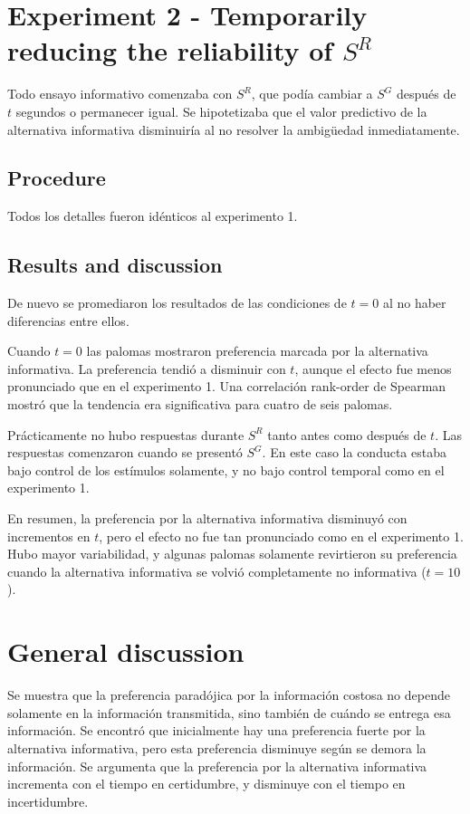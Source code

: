\documentclass[a4paper,12pt]{article}
\begin{document}
\section{Experiment 2 - Temporarily reducing the reliability of $S^{R}$}

Todo ensayo informativo comenzaba con $S^{R}$, que podía cambiar a $S^{G}$ después de $t$ segundos o permanecer igual.
Se hipotetizaba que el valor predictivo de la alternativa informativa disminuiría al no resolver la ambigüedad inmediatamente.

\subsection{Procedure}

Todos los detalles fueron idénticos al experimento 1.

\subsection{Results and discussion}

De nuevo se promediaron los resultados de las condiciones de $t = 0$ al no haber diferencias entre ellos.

Cuando $t = 0$ las palomas mostraron preferencia marcada por la alternativa informativa.
La preferencia tendió a disminuir con $t$, aunque el efecto fue menos pronunciado que en el experimento 1.
Una correlación rank-order de Spearman mostró que la tendencia era significativa para cuatro de seis palomas.

Prácticamente no hubo respuestas durante $S^{R}$ tanto antes como después de $t$.
Las respuestas comenzaron cuando se presentó $S^{G}$.
En este caso la conducta estaba bajo control de los estímulos solamente, y no bajo control temporal como en el experimento 1.

En resumen, la preferencia por la alternativa informativa disminuyó con incrementos en $t$, pero el efecto no fue tan pronunciado como en el experimento 1.
Hubo mayor variabilidad, y algunas palomas solamente revirtieron su preferencia cuando la alternativa informativa se volvió completamente no informativa ($t = 10$).

\section{General discussion}

Se muestra que la preferencia paradójica por la información costosa no depende solamente en la información transmitida, sino también de cuándo se entrega esa información.
Se encontró que inicialmente hay una preferencia fuerte por la alternativa informativa, pero esta preferencia disminuye según se demora la información.
Se argumenta que la preferencia por la alternativa informativa incrementa con el tiempo en certidumbre, y disminuye con el tiempo en incertidumbre.
\end{document}
